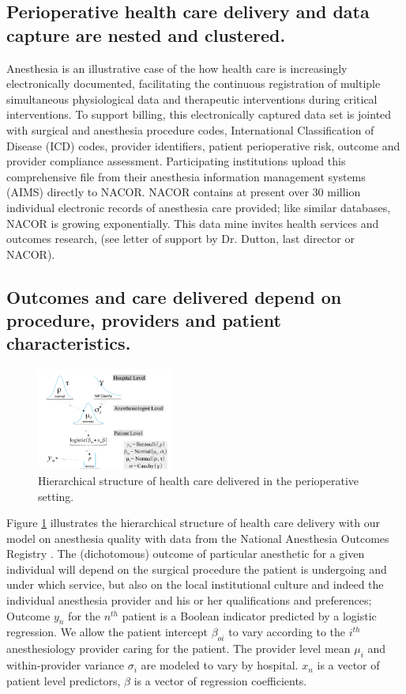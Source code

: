 \documentclass[11pt,notitlepage]{article}
\begin{document}
\subsection*{Perioperative health care delivery and data capture are nested and clustered.}
Anesthesia is an illustrative case of the how health care is increasingly electronically documented, facilitating the continuous registration of multiple simultaneous physiological data and therapeutic interventions during critical interventions. To support billing, this electronically captured data set is jointed with surgical and anesthesia procedure codes, International Classification of Disease (ICD) codes, provider identifiers, patient perioperative risk, outcome and provider compliance assessment. Participating institutions upload this comprehensive file from their anesthesia information management systems (AIMS) directly to NACOR. NACOR contains at present over 30 million individual electronic records of anesthesia care provided; like similar databases, NACOR is growing exponentially. This data mine invites health services and outcomes research, (see letter of support by Dr. Dutton, last director or NACOR).

\subsection*{Outcomes and care delivered depend on procedure, providers and patient characteristics.} 

\begin{figure} 
\includegraphics[width=0.4\textwidth]{Figures/DistrogramNACOR.pdf} 
\caption{Hierarchical structure of health care delivered in the perioperative setting.}
\label{fig:NACOR}
\end{figure}

Figure \ref{fig:NACOR} illustrates the hierarchical structure of health care delivery with our model on anesthesia quality with data from the National Anesthesia Outcomes Registry . The (dichotomous) outcome of particular anesthetic for a given individual will depend on the surgical procedure the patient is undergoing and under which service, but also on the local institutional culture and indeed the individual anesthesia provider and his or her qualifications and preferences\cite{AndreaeWhite2015}; Outcome $y_n$ for the $n^{th}$ patient is a Boolean indicator predicted by a logistic regression. We allow the patient intercept $\beta_{oi}$ to vary according to the $i^{th}$ anesthesiology provider caring for the patient. The provider level mean $\mu_i$ and within-provider variance $\sigma_i$ are modeled to vary by hospital. $x_n$ is a vector of patient level predictors, $\beta$ is a vector of regression coefficients.  
\end{document}
